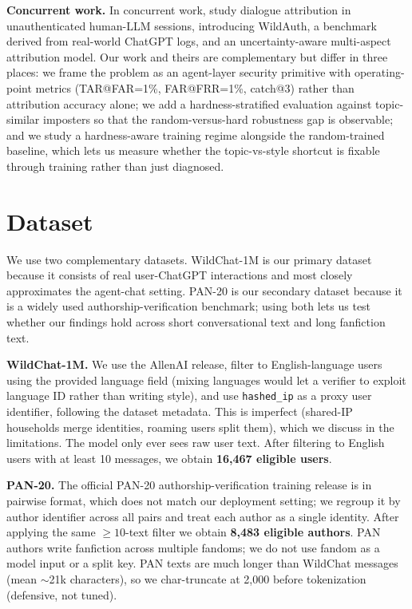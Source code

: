 \documentclass[11pt]{article}
\begin{document}
\noindent\textbf{Concurrent work.} In concurrent work, \citet{shen2026chatbot} study dialogue attribution in unauthenticated human-LLM sessions, introducing WildAuth, a benchmark derived from real-world ChatGPT logs, and an uncertainty-aware multi-aspect attribution model. Our work and theirs are complementary but differ in three places: we frame the problem as an agent-layer security primitive with operating-point metrics (TAR@FAR=1\%, FAR@FRR=1\%, catch@3) rather than attribution accuracy alone; we add a hardness-stratified evaluation against topic-similar imposters so that the random-versus-hard robustness gap is observable; and we study a hardness-aware training regime alongside the random-trained baseline, which lets us measure whether the topic-vs-style shortcut is fixable through training rather than just diagnosed.

\section{Dataset}
\label{sec:dataset}

We use two complementary datasets. WildChat-1M \citep{zhao2024wildchat} is our primary dataset because it consists of real user-ChatGPT interactions and most closely approximates the agent-chat setting. PAN-20 \citep{bevendorff2020overview} is our secondary dataset because it is a widely used authorship-verification benchmark; using both lets us test whether our findings hold across short conversational text and long fanfiction text.

\noindent\textbf{WildChat-1M.} We use the AllenAI release, filter to English-language users using the provided language field (mixing languages would let a verifier to exploit language ID rather than writing style), and use \texttt{hashed\_ip} as a proxy user identifier, following the dataset metadata. This is imperfect (shared-IP households merge identities, roaming users split them), which we discuss in the limitations. The model only ever sees raw user text. After filtering to English users with at least 10 messages, we obtain \textbf{16,467 eligible users}.

\noindent\textbf{PAN-20.} The official PAN-20 authorship-verification training release is in pairwise format, which does not match our deployment setting; we regroup it by author identifier across all pairs and treat each author as a single identity. After applying the same $\geq 10$-text filter we obtain \textbf{8,483 eligible authors}. PAN authors write fanfiction across multiple fandoms; we do not use fandom as a model input or a split key. PAN texts are much longer than WildChat messages (mean $\sim$21k characters), so we char-truncate at 2{,}000 before tokenization (defensive, not tuned).
\end{document}
